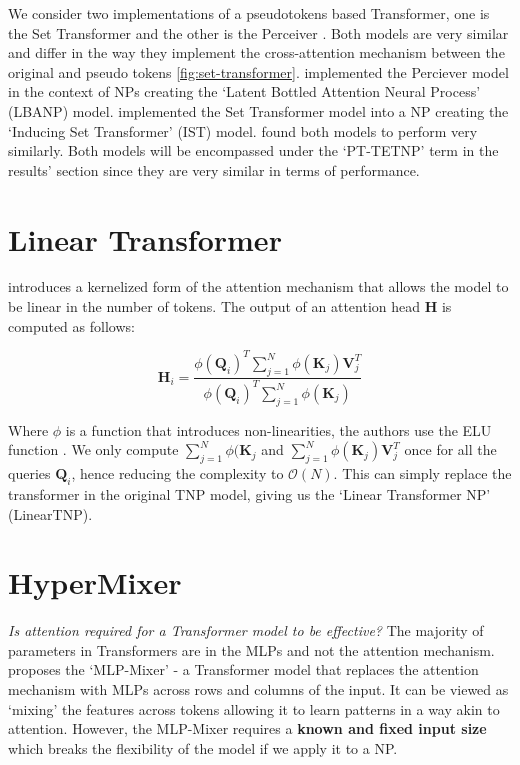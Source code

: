 \documentclass[../../main.tex]{subfiles}
\begin{document}
We consider two implementations of a pseudotokens based Transformer, one is the Set Transformer \cite{lee2019set} and the other is the Perceiver \cite{jaegle2021perceiver}. Both models are very similar and differ in the way they implement the cross-attention mechanism between the original and pseudo tokens \autoref{fig:set-transformer}. \cite{feng2023latent} implemented the Perciever model in the context of NPs creating the `Latent Bottled Attention Neural Process' (LBANP) model. \cite{anonymous2024translationequivariant} implemented the Set Transformer model into a NP creating the `Inducing Set Transformer' (IST) model. \cite{anonymous2024translationequivariant} found both models to perform very similarly. Both models will be encompassed under the `PT-TETNP' term in the results' section since they are very similar in terms of performance.

\section{Linear Transformer}

\cite{katharopoulos2020transformers} introduces a kernelized form of the attention mechanism that allows the model to be linear in the number of tokens. The output of an attention head $\bm{H}$ is computed as follows:

\begin{equation}
    \bm{H}_i = \frac{\phi(\bm{Q}_i)^T \sum_{j=1}^{N} \phi(\bm{K}_j) \bm{V}_j^T}{\phi(\bm{Q}_i)^T \sum_{j=1}^{N} \phi(\bm{K}_j)}
\end{equation}

Where $\phi$ is a function that introduces non-linearities, the authors use the ELU function \cite{clevert2016fast}. We only compute $\sum_{j=1}^{N} \phi(\bm{K}_j$ and $\sum_{j=1}^{N} \phi(\bm{K}_j) \bm{V}_j^T$ once for all the queries $\bm{Q}_i$, hence reducing the complexity to $\mathcal{O}(N)$. This can simply replace the transformer in the original TNP model, giving us the `Linear Transformer NP' (LinearTNP).


\section{HyperMixer}

\emph{Is attention required for a Transformer model to be effective?} The majority of parameters in Transformers are in the MLPs and not the attention mechanism. \cite{tolstikhin2021mlpmixer} proposes the `MLP-Mixer' - a Transformer model that replaces the attention mechanism with MLPs across rows and columns of the input. It can be viewed as `mixing' the features across tokens allowing it to learn patterns in a way akin to attention. However, the MLP-Mixer requires a \textbf{known and fixed input size} which breaks the flexibility of the model if we apply it to a NP.
\end{document}
